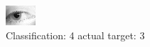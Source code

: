 \begin{figure}[h!]
\begin{center}
\includegraphics[width=0.60\columnwidth]{figures/ID1367_class_4_target_3.png}
\end{center}
\caption{ Classification: 4 actual target: 3}
\label{fig:ID1367_class_4_target_3}
\end{figure}
